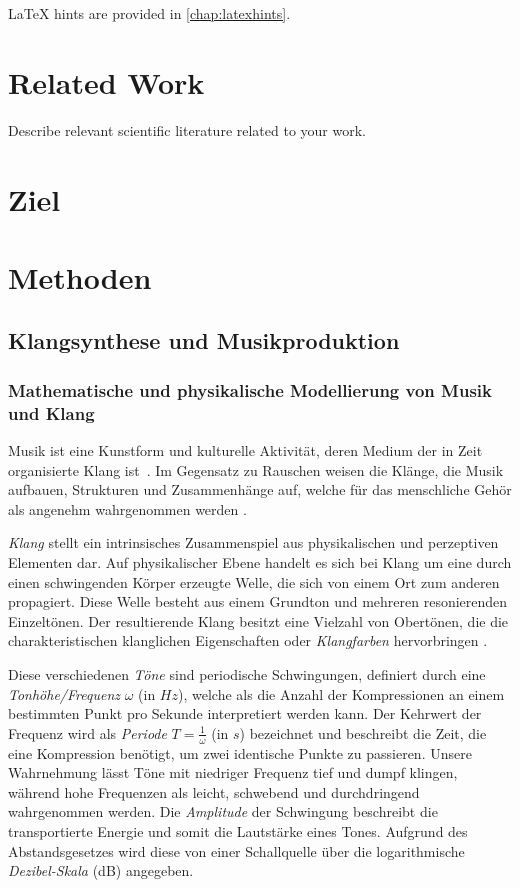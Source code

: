 \documentclass[
  a4paper,  %
  twoside,  %
  bibliography=totoc,
  headsepline,
  cleardoublepage=empty,
  parskip=half,
  draft=false
]{scrbook}
\begin{document}
LaTeX hints are provided in \autoref{chap:latexhints}.

\chapter{Related Work}

Describe relevant scientific literature related to your work.

\chapter{Ziel}

\chapter{Methoden}

\section{Klangsynthese und Musikproduktion}

\subsection{Mathematische und physikalische Modellierung von Musik und Klang}
\glqq Musik ist eine Kunstform und kulturelle Aktivität, deren Medium der in Zeit organisierte Klang ist\grqq \, \cite{tsuji_physics_2021}. Im Gegensatz zu Rauschen weisen die Klänge, die Musik aufbauen, Strukturen und Zusammenhänge auf, welche für das menschliche Gehör als angenehm wahrgenommen werden \cite{parker_good_2009}.  

\emph{Klang} stellt ein intrinsisches Zusammenspiel aus physikalischen und perzeptiven Elementen dar. Auf physikalischer Ebene handelt es sich bei Klang um eine durch einen schwingenden Körper erzeugte Welle, die sich von einem Ort zum anderen propagiert. Diese Welle besteht aus einem Grundton und mehreren resonierenden Einzeltönen. Der resultierende Klang besitzt eine Vielzahl von Obertönen, die die charakteristischen klanglichen Eigenschaften oder \emph{Klangfarben} hervorbringen \cite{tsuji_physics_2021, parker_good_2009}.

Diese verschiedenen \emph{Töne} sind periodische Schwingungen, definiert durch eine \emph{Tonhöhe/Frequenz} $\omega$ (in $Hz$), welche als die Anzahl der Kompressionen an einem bestimmten Punkt pro Sekunde interpretiert werden kann. Der Kehrwert der Frequenz wird als \emph{Periode} $T=\frac{1}{\omega}$ (in $s$) bezeichnet und beschreibt die Zeit, die eine Kompression benötigt, um zwei identische Punkte zu passieren. Unsere Wahrnehmung lässt Töne mit niedriger Frequenz tief und dumpf klingen, während hohe Frequenzen als leicht, schwebend und durchdringend wahrgenommen werden. Die \emph{Amplitude} der Schwingung beschreibt die transportierte Energie und somit die Lautstärke eines Tones. Aufgrund des Abstandsgesetzes wird diese von einer Schallquelle über die logarithmische \emph{Dezibel-Skala} (dB) angegeben.  \cite{tsuji_physics_2021, parker_good_2009}
\end{document}
